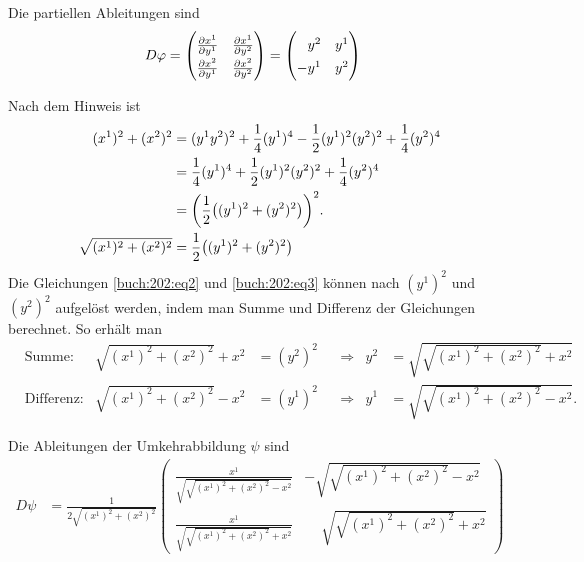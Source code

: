 \begin{loesung}
\begin{teilaufgaben}
\item
Die partiellen Ableitungen sind
\begin{align*}
D\varphi
&=
\bgroup
\renewcommand{\arraystretch}{1.4}
\begin{pmatrix}
\frac{\partial x^1}{\partial y^1}&\frac{\partial x^1}{\partial y^2}\\
\frac{\partial x^2}{\partial y^1}&\frac{\partial x^2}{\partial y^2}
\end{pmatrix}
\egroup
=
\begin{pmatrix}
\phantom{-}y^2 & y^1 \\
         - y^1 & y^2
\end{pmatrix}
\end{align*}
\item
Nach dem Hinweis ist
\begin{align}
(x^1)^2 + (x^2)^2
&=
(y^1y^2)^2
+
\frac14 (y^1)^4 - \frac12 (y^1)^2(y^2)^2 + \frac14 (y^2)^4
\notag
\\
&=
\frac14 (y^1)^4 + \frac12 (y^1)^2(y^2)^2 + \frac14 (y^2)^4
\notag
\\
&=
\biggl(
\frac12\bigl((y^1)^2 + (y^2)^2\bigr)
\biggr)^2.
\\
\sqrt{(x^1)^2+(x^2)^2} &= \frac12\bigl((y^1)^2 + (y^2)^2\bigr)
\label{buch:202:eq3}
\end{align}
Die Gleichungen 
\eqref{buch:202:eq2}
und
\eqref{buch:202:eq3}
können nach $(y^1)^2$ und $(y^2)^2$ aufgelöst werden, indem man
Summe und Differenz der Gleichungen berechnet.
So erhält man
\begin{align*}
&\text{Summe:}
&
\!\sqrt{(x^1)^2+(x^2)^2}
+
x^2
&=
(y^2)^2
&&\Rightarrow&
y^2
&=
\!\sqrt{
\!\sqrt{(x^1)^2+(x^2)^2}
+
x^2
}
\\
&\text{Differenz:}
& 
\!\sqrt{(x^1)^2+(x^2)^2}
-
x^2
&=
(y^1)^2
&&\Rightarrow&
y^1
&=
\!\sqrt{
\!\sqrt{(x^1)^2+(x^2)^2}
-
x^2
}.
\end{align*}
\item
Die Ableitungen der Umkehrabbildung $\psi$ sind
\begin{align*}
D\psi
&=
\frac{1}{
2\!\sqrt{(x^1)^2 +(x^2)^2}
}
\begin{pmatrix}
\displaystyle
\frac{x^1}{
\!\sqrt{\!\sqrt{(x^1)^2+(x^2)^2}-x^2}
}
&
\displaystyle
-\!\sqrt{\!\sqrt{(x^1)^2+(x^2)^2}-x^2}
\\
\displaystyle
\frac{x^1}{
\!\sqrt{\!\sqrt{(x^1)^2+(x^2)^2}+x^2}
}
&
\displaystyle
\phantom{-}\!\sqrt{\!\sqrt{(x^1)^2+(x^2)^2}+x^2}

\end{pmatrix}
\end{align*}
\end{teilaufgaben}
\end{loesung}

